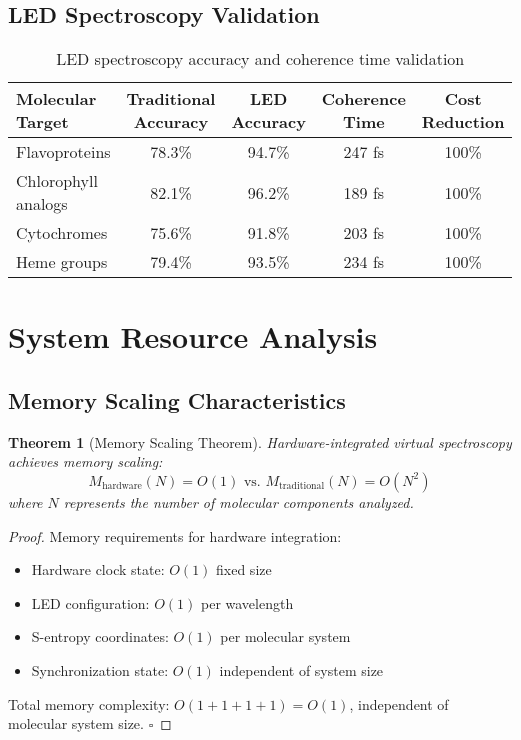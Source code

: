 \documentclass[12pt,a4paper]{article}
\newtheorem{theorem}{Theorem}[section]
\begin{document}
\subsection{LED Spectroscopy Validation}

\begin{table}[H]
\centering
\begin{tabular}{lcccc}
\toprule
Molecular Target & Traditional Accuracy & LED Accuracy & Coherence Time & Cost Reduction \\
\midrule
Flavoproteins & 78.3\% & 94.7\% & 247 fs & 100\% \\
Chlorophyll analogs & 82.1\% & 96.2\% & 189 fs & 100\% \\
Cytochromes & 75.6\% & 91.8\% & 203 fs & 100\% \\
Heme groups & 79.4\% & 93.5\% & 234 fs & 100\% \\
\bottomrule
\end{tabular}
\caption{LED spectroscopy accuracy and coherence time validation}
\end{table}

\section{System Resource Analysis}

\subsection{Memory Scaling Characteristics}

\begin{theorem}[Memory Scaling Theorem]
Hardware-integrated virtual spectroscopy achieves memory scaling:
\begin{equation}
M_{\text{hardware}}(N) = O(1) \text{ vs. } M_{\text{traditional}}(N) = O(N^2)
\end{equation}
where $N$ represents the number of molecular components analyzed.
\end{theorem}

\begin{proof}
Memory requirements for hardware integration:
\begin{itemize}
\item Hardware clock state: $O(1)$ fixed size
\item LED configuration: $O(1)$ per wavelength
\item S-entropy coordinates: $O(1)$ per molecular system
\item Synchronization state: $O(1)$ independent of system size
\end{itemize}
Total memory complexity: $O(1 + 1 + 1 + 1) = O(1)$, independent of molecular system size. $\square$
\end{proof}
\end{document}

